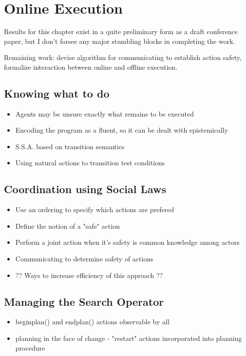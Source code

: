 \chapter{Online Execution}\label{ch:online-exec}

Results for this chapter exist in a quite preliminary form as a draft conference paper, but I don't forsee any major stumbling blocks in completing the work.

Remaining work: devise algorithm for communicating to establish action safety, formalize interaction between online and offline execution.

\section{Knowing what to do}
\begin{itemize}
\item Agents may be unsure exactly what remains to be executed
\item Encoding the program as a fluent, so it can be dealt with epistemically
\item S.S.A. based on transition semantics
\item Using natural actions to transition test conditions
\end{itemize}

\section{Coordination using Social Laws}
\begin{itemize}
\item Use an ordering to specify which actions are prefered
\item Define the notion of a "safe" action
\item Perform a joint action when it's safety is common knowledge among actors
\item Communicating to determine safety of actions
\item ?? Ways to increase efficiency of this approach ??
\end{itemize}

\section{Managing the Search Operator}
\begin{itemize}
\item beginplan() and endplan() actions observable by all
\item planning in the face of change - "restart" actions incorporated into planning procedure
\end{itemize}

